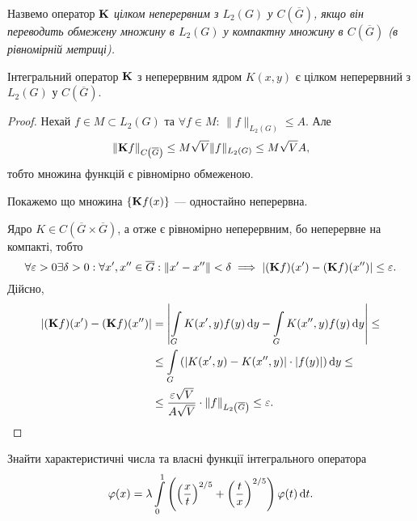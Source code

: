 \begin{definition}
	Назвемо оператор $\bf{K}$ \it{цілком неперервним} з $L_2(G)$ у $C\left(\overline G\right)$, якщо він переводить обмежену множину в $L_2(G)$ у компактну множину в $C\left(\overline G\right)$ (в рівномірній метриці).
\end{definition}

\begin{lemma}
	Інтегральний оператор $\bf{K}$ з неперервним ядром $K(x, y)$ є цілком неперервний з $L_2(G)$ у $C\left(\overline G\right)$.
\end{lemma}

\begin{proof}
	Нехай $f \in M \subset L_2(G)$ та $\forall f \in M$: $\|f\|_{L_2(G)} \le A$. Але 
	\begin{equation}
		\|\bf{K} f\|_{C\left(\overline G\right)} \le M \sqrt{V} \|f\|_{L_2(G)} \le M \sqrt{V} A,	
	\end{equation}
	тобто множина функцій є рівномірно обмеженою. \medskip

	Покажемо що множина $\{ \bf{K}f(x)\}$ --- одностайно неперервна. \medskip

	Ядро $K \in C\left(\overline G \times \overline G\right)$, а отже є рівномірно неперервним, бо неперервне на компакті, тобто
	\begin{equation}
		\forall \epsilon > 0 \exists \delta > 0: \forall x', x'' \in \overline G: \left\|x' - x''\right\| < \delta \implies \left|(\bf{K}f)(x') - (\bf{K}f)(x'')\right| \le \epsilon.
	\end{equation}
	Дійсно,
	\begin{equation}
		\begin{aligned}
			|(\bf{K}f)(x') - (\bf{K}f)(x'')| &= \left| \Int_G K(x', y) f(y) \diff y - \Int_G K(x'', y) f(y) \diff y \right| \le \\
			&\le \Int_G \left( |K(x', y) - K(x'', y)| \cdot |f(y)| \right) \diff y \le \\
			&\le \dfrac{\epsilon \sqrt{V}}{A \sqrt{V}} \cdot \|f\|_{L_2\left(\overline G\right)} \le \epsilon.
		\end{aligned}
	\end{equation}
\end{proof}

\newpage

\begin{example}
	Знайти характеристичні числа та власні функції інтегрального оператора 
	\begin{equation*}
		\phi(x) = \lambda \Int_0^1 \left( \left( \dfrac{x}{t} \right)^{2/5} + \left( \dfrac{t}{x} \right)^{2/5} \right) \phi(t) \diff t.
	\end{equation*}
\end{example}

